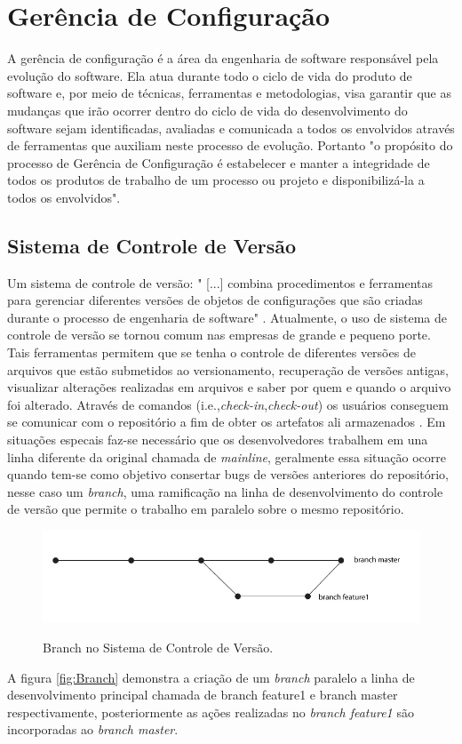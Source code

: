 \section{Gerência de Configuração}
A gerência de configuração é a área da engenharia de software responsável pela evolução do software. Ela atua durante todo o ciclo de vida do produto de software e, por meio de técnicas, ferramentas e metodologias, visa garantir que as mudanças que irão ocorrer dentro do ciclo de vida do desenvolvimento do software sejam identificadas, avaliadas e comunicada a todos os envolvidos através de ferramentas que auxiliam neste processo de evolução.
Portanto "o propósito do processo de Gerência de Configuração é estabelecer e manter a integridade de todos os produtos de trabalho de um processo ou projeto e disponibilizá-la a todos os envolvidos"\space\cite{mpsbr}.
\subsection{Sistema de Controle de Versão}
Um sistema de controle de versão: "	[...] combina procedimentos e ferramentas para gerenciar diferentes versões de objetos de configurações que são criadas durante o processo de engenharia de software" \cite[p.~927]{pressman2010}.
Atualmente, o uso de sistema de controle de versão se tornou comum nas empresas de grande e pequeno porte. Tais ferramentas permitem que se tenha o controle de diferentes versões de arquivos que estão submetidos ao versionamento, recuperação de versões antigas, visualizar alterações realizadas em arquivos e saber por quem e quando o arquivo foi alterado. Através de comandos (i.e.,\textit{check-in},\textit{check-out}) os usuários conseguem se comunicar com o repositório a fim de obter os artefatos ali armazenados \cite{gleiph2011}. Em situações especais faz-se necessário que os desenvolvedores trabalhem em una linha diferente da original chamada de \textit{mainline}, geralmente essa situação ocorre quando tem-se como objetivo consertar bugs de versões anteriores do repositório, nesse caso um \textit{branch}, uma ramificação na linha de desenvolvimento do controle de versão que permite o trabalho em paralelo sobre o mesmo repositório.
\begin{figure}[h]
\centering
\caption[Branch no Sistema de Controle de Versão]{Branch no Sistema de Controle de Versão.}
\includegraphics[width=0.7\linewidth]{./images/branch}
\label{fig:Branch}
\end{figure}
A figura \autoref{fig:Branch} demonstra a criação de um \textit{branch} paralelo a linha de desenvolvimento principal chamada de branch feature1 e branch master respectivamente, posteriormente as ações realizadas no \textit{branch feature1} são incorporadas ao \textit{branch master}.
